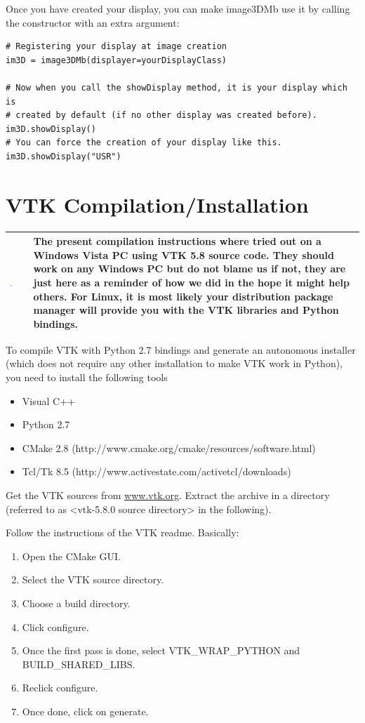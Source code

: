\documentclass[a4paper,10pt,oneside]{article}
\newenvironment{tipBox}
{
    \begin{center}
    \begin{tabular}{ | b{0.1\textwidth} b{0.8\textwidth} | }
    \hline
    \rowcolor{lightblue}
    \includegraphics[width=0.1\textwidth]{Crystal_Clear_action_info.png} &
}
{
    \\
    \hline
    \end{tabular}
    \end{center}
}
\begin{document}
Once you have created your display, you can make image3DMb use it by calling the
constructor with an extra argument:

\lstset{language=Python}
\begin{lstlisting}
# Registering your display at image creation
im3D = image3DMb(displayer=yourDisplayClass)

# Now when you call the showDisplay method, it is your display which is 
# created by default (if no other display was created before).
im3D.showDisplay()
# You can force the creation of your display like this.
im3D.showDisplay("USR")
\end{lstlisting}

\pagebreak

\appendix
\section{VTK Compilation/Installation}
\label{cha:vtkInst}

\begin{tipBox}
The present compilation instructions where tried out on a Windows Vista PC
using VTK 5.8 source code. They should work on any Windows PC but do not blame
us if not, they are just here as a reminder of how we did in the hope it might
help others. For Linux, it is most likely your distribution package manager
will provide you with the VTK libraries and Python bindings.
\end{tipBox}

To compile VTK with Python 2.7 bindings and generate an autonomous installer
(which does not require any other installation to make VTK work in Python),
you need to install the following tools

\begin{itemize}
\item Visual C++
\item Python 2.7
\item CMake 2.8 (http://www.cmake.org/cmake/resources/software.html)
\item Tcl/Tk 8.5 (http://www.activestate.com/activetcl/downloads)
\end{itemize}

Get the VTK sources from \url{www.vtk.org}. Extract the archive in a 
directory (referred to as <vtk-5.8.0 source directory> in the 
following).

Follow the instructions of the VTK readme. Basically:

\begin{enumerate}
\item Open the CMake GUI.
\item Select the VTK source directory.
\item Choose a build directory.
\item Click configure.
\item Once the first pass is done, select VTK\_WRAP\_PYTHON and 
BUILD\_SHARED\_LIBS.
\item Reclick configure.
\item Once done, click on generate.
\end{enumerate}
\end{document}
